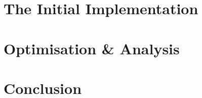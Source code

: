\documentclass[11pt, a4paper, twocolumn]{article}
\begin{document}
\section{The Initial Implementation}


\section{Optimisation \& Analysis}


\section{Conclusion}






\end{document}
